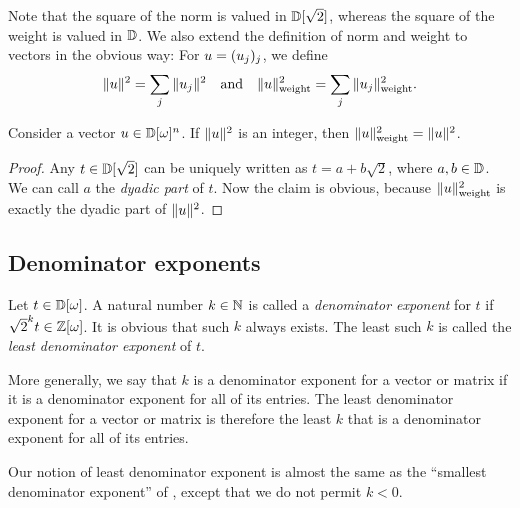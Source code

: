 Note that the square of the norm is valued in $\mathbb{D}[\sqrt{2}]$, whereas the square of the weight is
valued in $\mathbb{D}$. We also extend the definition of norm and weight to vectors in the obvious way: For
$u = (u_j)_j$, we define
\[
  \|u\|^2 = \sum_j\|u_j\|^2
  \quad\mbox{and}\quad
  \|u\|_{\rm weight}^2 = \sum_j\|u_j\|_{\rm weight}^2.
\]

\begin{lemma}\label{lem-ring-norm}
  Consider a vector $u\in\mathbb{D}[\omega]^n$. If $\|u\|^2$ is an integer, then $\|u\|_{\rm weight}^2=\|u\|^2$.
\end{lemma}

\begin{proof}
  Any $t\in\mathbb{D}[\sqrt{2}]$ can be uniquely written as $t=a+b\sqrt{2}$, where $a,b\in\mathbb{D}$. We can call
  $a$ the {\em dyadic part} of $t$. Now the claim is obvious, because $\|u\|_{\rm weight}^2$ is exactly the
  dyadic part of $\|u\|^2$.
\end{proof}


\subsection{Denominator exponents} %
\label{sub:denominator_exponents}
\begin{definition}
  Let $t\in\mathbb{D}[\omega]$. A natural number $k\in\mathbb{N}$ is called a {\em denominator exponent} for $t$ if
  $\sqrt{2}^k t \in \mathbb{Z}[\omega]$. It is obvious that such $k$ always exists. The least such $k$ is called
  the {\em least denominator exponent} of $t$.

  More generally, we say that $k$ is a denominator exponent for a vector or matrix if it is a
  denominator exponent for all of its entries. The least denominator exponent for a vector or
  matrix is therefore the least $k$ that is a denominator exponent for all of its entries.
\end{definition}

\begin{remark}
  Our notion of least denominator exponent is almost the same as the ``smallest denominator
  exponent'' of {\cite{Kliuchnikov-et-al}}, except that we do not permit $k<0$.
\end{remark}


